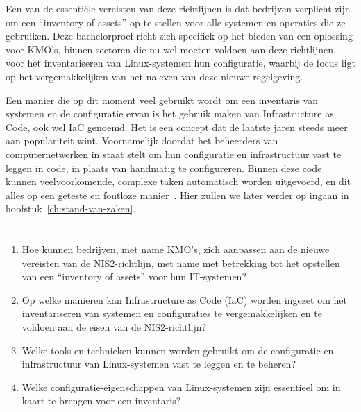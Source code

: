 Een van de essenti\"ele vereisten van deze richtlijnen is dat bedrijven verplicht zijn om een ``inventory of assets'' op te stellen voor alle systemen en operaties die ze gebruiken.
Deze bachelorproef richt zich specifiek op het bieden van een oplossing voor KMO's, binnen sectoren die nu wel moeten voldoen aan deze richtlijnen, voor het inventariseren van Linux-systemen hun configuratie, waarbij de focus ligt op het vergemakkelijken van het naleven van deze nieuwe regelgeving.

Een manier die op dit moment veel gebruikt wordt om een inventaris van systemen en de configuratie ervan is het gebruik maken van Infrastructure as Code, ook wel IaC genoemd.
Het is een concept dat de laatste jaren steeds meer aan populariteit wint. Voornamelijk doordat het beheerders van computernetwerken in staat stelt om hun configuratie en infrastructuur vast te leggen in code, in plaats van handmatig te configureren.
Binnen deze code kunnen veelvoorkomende, complexe taken automatisch worden uitgevoerd, en dit alles op een geteste en foutloze manier~\autocite{chef-what-is-iac}.
Hier zullen we later verder op ingaan in hoofstuk~\ref{ch:stand-van-zaken}.

\section{}%
\label{sec:onderzoeksvraag}

\begin{enumerate}
    \item Hoe kunnen bedrijven, met name KMO's, zich aanpassen aan de nieuwe vereisten van de NIS2-richtlijn, met name met betrekking tot het opstellen van een ``inventory of assets'' voor hun IT-systemen?
    \item Op welke manieren kan Infrastructure as Code (IaC) worden ingezet om het inventariseren van systemen en configuraties te vergemakkelijken en te voldoen aan de eisen van de NIS2-richtlijn?
    \item Welke tools en technieken kunnen worden gebruikt om de configuratie en infrastructuur van Linux-systemen vast te leggen en te beheren?
    \item Welke configuratie-eigenschappen van Linux-systemen zijn essentieel om in kaart te brengen voor een inventaris?
\end{enumerate}

\section{}%
\label{sec:onderzoeksdoelstelling}

